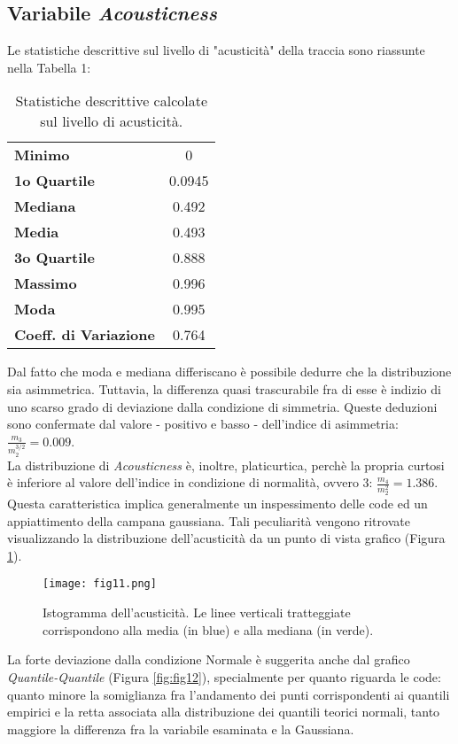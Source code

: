 \documentclass[fleqn,10pt]{SelfArx} %
\begin{document}
\subsection*{Variabile \textit{Acousticness}}
Le statistiche descrittive sul livello di "acusticità" della traccia sono riassunte nella Tabella 1:
{\begin{table}[H]
\centering

\begin{tabular}[t]{lc}
\toprule
\midrule
\textbf{Minimo}&0\\
\textbf{1o Quartile}&0.0945\\
\textbf{Mediana}&0.492\\
\textbf{Media}&0.493\\
\textbf{3o Quartile}&0.888\\
\textbf{Massimo}&0.996\\
\textbf{Moda}&0.995\\
\textbf{Coeff. di Variazione}&0.764\\
\bottomrule
\end{tabular}
\caption{Statistiche descrittive calcolate sul livello di acusticità.}
\end{table}}
Dal fatto che moda e mediana differiscano è possibile dedurre che la distribuzione sia asimmetrica. Tuttavia, la differenza quasi trascurabile fra di esse è indizio di uno scarso grado di deviazione dalla condizione di simmetria. Queste deduzioni sono confermate dal valore - positivo e basso - dell'indice di asimmetria: $\frac{m_3}{m_2^{3/2}}=0.009$.\\
La distribuzione di \textit{Acousticness} è, inoltre, platicurtica, perchè la propria curtosi è inferiore al valore dell'indice in condizione di normalità, ovvero 3: $\frac{m_4}{m_2^{2}}=1.386$. Questa caratteristica implica generalmente un inspessimento delle code ed un appiattimento della campana gaussiana. Tali peculiarità vengono ritrovate visualizzando la distribuzione dell'acusticità da un punto di vista grafico (Figura \ref{fig:fig11}).
\begin{figure}[H]
    \centering
    \texttt{[image: fig11.png]}
    \label{fig:fig11}
    \caption{Istogramma dell'acusticità. Le linee verticali tratteggiate corrispondono alla media (in blue) e alla mediana (in verde).}
\end{figure}
La forte deviazione dalla condizione Normale è suggerita anche dal grafico \textit{Quantile-Quantile} (Figura \ref{fig:fig12}), specialmente per quanto riguarda le code: quanto minore la somiglianza fra l'andamento dei punti corrispondenti ai quantili empirici e la retta associata alla distribuzione dei quantili teorici normali, tanto maggiore la differenza fra la variabile esaminata e la Gaussiana.
\end{document}
